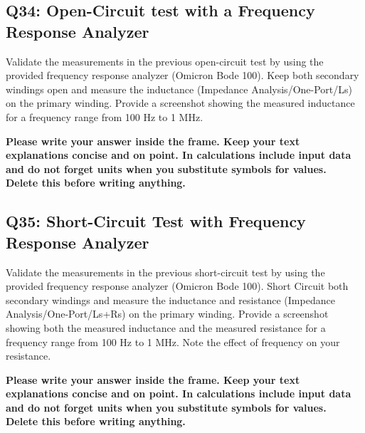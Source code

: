 \documentclass{PELsmallreport}
\begin{document}
\subsection{Q34: Open-Circuit test with a Frequency Response Analyzer} 
Validate the measurements in the previous open-circuit test by using the provided frequency response analyzer (Omicron Bode 100). 
Keep both secondary windings open and measure the inductance (Impedance Analysis/One-Port/Ls) on the primary winding. 
Provide a screenshot showing the measured inductance for a frequency range from 100 Hz to 1 MHz. 

\begin{framed}
	\vspace{2em}
	\textbf{Please write your answer inside the frame. Keep your text explanations concise and on point. In calculations include input data and do not forget units when you substitute symbols for values. \\ Delete this before writing anything.}
	\vspace{2em}
 
\end{framed}
\hfill {}







\subsection{Q35: Short-Circuit Test with Frequency Response Analyzer} 
Validate the measurements in the previous short-circuit test by using the provided frequency response analyzer (Omicron Bode 100). 
Short Circuit both secondary windings and measure the inductance and resistance (Impedance Analysis/One-Port/Ls+Rs) on the primary winding. 
Provide a screenshot showing both the measured inductance and the measured resistance for a frequency range from 100 Hz to 1 MHz. Note the effect of frequency on your resistance. 

\begin{framed}
	\vspace{2em}
	\textbf{Please write your answer inside the frame. Keep your text explanations concise and on point. In calculations include input data and do not forget units when you substitute symbols for values. \\ Delete this before writing anything.}
	\vspace{2em}
 
\end{framed}
\hfill {}
\end{document}
